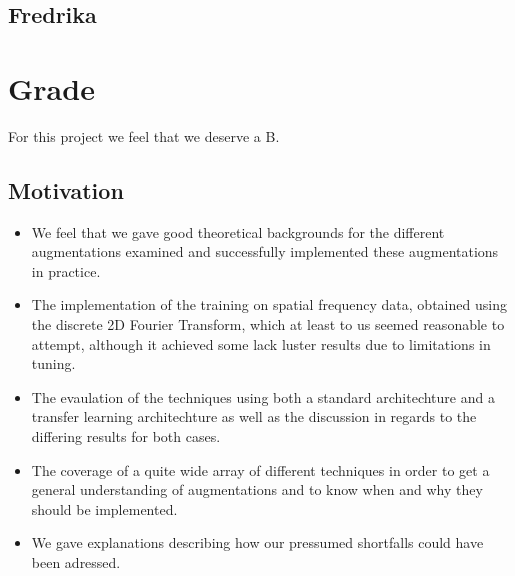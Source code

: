 \documentclass{article}
\begin{document}
\subsection*{Fredrika}

\section*{Grade}

For this project we feel that we deserve a B. 

\subsection*{Motivation}

\begin{itemize}
 \item We feel that we gave good theoretical backgrounds for the different augmentations examined and successfully implemented these augmentations in practice. 
 \item The implementation of the training on spatial frequency data, obtained using the discrete 2D Fourier Transform, which at least to us seemed reasonable to attempt, although it achieved some lack luster results due to limitations in tuning.
 \item The evaulation of the techniques using both a standard architechture and a transfer learning architechture as well as the discussion in regards to the differing results for both cases.
 \item The coverage of a quite wide array of different techniques in order to get a general understanding of augmentations and to know when and why they should be implemented.
 \item We gave explanations describing how our pressumed shortfalls could have been adressed.
\end{itemize}
\end{document}
